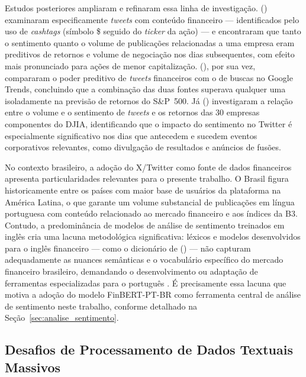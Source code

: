 Estudos posteriores ampliaram e refinaram essa linha de investigação. \citeauthor{sprenger2014} (\citeyear{sprenger2014}) examinaram especificamente \textit{tweets} com conteúdo financeiro --- identificados pelo uso de \textit{cashtags} (símbolo \$ seguido do \textit{ticker} da ação) --- e encontraram que tanto o sentimento quanto o volume de
publicações relacionadas a uma empresa eram preditivos de retornos e volume de negociação nos dias subsequentes, com efeito mais pronunciado para ações de menor
capitalização. \citeauthor{mao2011} (\citeyear{mao2011}), por sua vez, compararam o poder preditivo de \textit{tweets} financeiros com o de buscas no Google Trends,
concluindo que a combinação das duas fontes superava qualquer uma isoladamente na previsão de retornos do S\&P~500. Já \citeauthor{ranco2015} (\citeyear{ranco2015})
investigaram a relação entre o volume e o sentimento de \textit{tweets} e os retornos das 30 empresas componentes do DJIA, identificando que o impacto do sentimento no
Twitter é especialmente significativo nos dias que antecedem e sucedem eventos corporativos relevantes, como divulgação de resultados e anúncios de fusões.

No contexto brasileiro, a adoção do X/Twitter como fonte de dados financeiros apresenta particularidades relevantes para o presente trabalho. O Brasil figura historicamente entre os países com maior base de usuários da plataforma na América Latina, o que garante um volume substancial de publicações em língua portuguesa com conteúdo relacionado ao mercado financeiro e aos índices da B3. Contudo, a predominância de modelos de análise de sentimento treinados em inglês cria uma lacuna metodológica significativa: léxicos e modelos desenvolvidos para o inglês financeiro --- como o dicionário de \citeauthor{loughran2011} (\citeyear{loughran2011}) --- não capturam adequadamente as nuances semânticas e o vocabulário específico do mercado financeiro brasileiro, demandando o desenvolvimento ou adaptação de ferramentas especializadas para o português \cite{santos2023finbert}. É precisamente essa lacuna que motiva a adoção do modelo FinBERT-PT-BR como ferramenta central de análise de sentimento neste trabalho, conforme detalhado na Seção~\ref{sec:analise_sentimento}.



\subsection{Desafios de Processamento de Dados Textuais Massivos}
\label{subsec:desafios_textuais}

